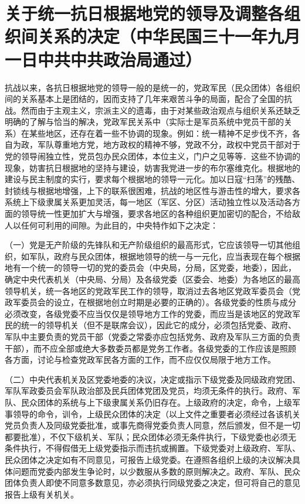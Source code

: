 \section[关于统一抗日根据地党的领导及调整各组织间关系的决定（中华民国三十一年九月一日中共中共政治局通过）]{关于统一抗日根据地党的领导及调整各组织间关系的决定（中华民国三十一年九月一日中共中共政治局通过）}


抗战以来，各抗日根据地党的领导一般的是统一的，党政军民（民众团体）各组织间的关系基本上是团结的，因而支持了几年来艰苦斗争的局面，配合了全国的抗战。然而由于主观主义，宗派主义的遗毒，由于对某些政治观点与组织关系还缺乏明确的了解与恰当的解决，党政军民关系中（实际士是军员系统中党员干部的关系）在某些地区，还存在着一些不协调的现象。例如：统一精神不足步伐不齐，各自为政，军队尊重地方党，地方政权的精神不够，党政不分，政权中党员干部对于党的领导闹独立性，党员包办民众团体，本位主义，门户之见等等．这些不协调的现象，妨害抗日根据地的坚持与建设，妨害我党进一步的布尔塞维克化。根据地的建设与民主制度的实行，要求每个根据地的领导一元化。加以日寇“扫荡”的残酷、封锁线与根据地增强，上下的联系很困难，抗战的地区性与游击性的增大，要求各系统上下级隶属关系更加灵活，每一地区（军区、分区）活动独立性以及活动各方面的领导统一性更加扩大与增强，要求各地区的各种组织更加密切的配合，不给敌人以任何可利用的间隙。为此目的，中央特作如下之决定：

（一）党是无产阶级的先锋队和无产阶级组织的最高形式，它应该领导一切其他组织，如军队，政府与民众团体，根据地领导的统一与一元化，应当表现在每个根据地有一个统一的领导一切的党的委员会（中央局，分局，区党委，地委），因此，确定中央代表机关（中央局、分局）及各级党委（区委会、地委）为各地区的最高领导机关，统一各地区的党政军民工作的领导，取消过去各地区党政军委员会（党政军委员会的设立，在根据地创立时期是必要的正确的）。各级党委的性质与成分必须改变，各级党委不应当仅仅是领导地方工作的党委，而应当是该地区的党政军民的统一的领导机关（但不是联席会议），因此它的成分，必须包括党委、政府、军队中主要负责的党员干部（党委之常委亦应包括党务、政府及军队三方面的负责干部），而不应全部或绝大多数委员都是党务工作者。各级党委的工作应该是照顾各方面，讨论与检查党政军民各方面的工作，而不应仅仅局限于地方工作。

（二）中央代表机关及区党委地委的决议，决定或指示下级党委及同级政府党团、军队军政委员会军队政治部及民兵团体党团及党员，均须无条件的执行。政府、军队、民众团体的系统与上下级隶属关系仍旧存在。上级政府的决定，命令，上级军事领导的命令，训令，上级民众团体的决定（以上文件之重要者必须经过各该机关党员负责人及同级党委批准，或事先商得党委负责人同意，然后颁发，但不是一切都要批准），不仅下级机关、军队；民众团体必须无条件执行，下级党委也必须无条件执行，不得假借无上级党委指示而违抗或搁置。下级党委对上级政府、军队、民众团体之决定如有不同意见，可报告上级党委。在遵照各组织上级的决议解决具体问题而党委内部发生争论时，以少数服从多数的原则解决之。政府、军队、民众团体负责人即使不同意多数意见，亦必须执行同级党委之决定，但可将自己的意见报告上级有关机关。

